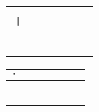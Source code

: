 \documentclass[12pt]{article}
\begin{document}
\begin{minipage}{0.45\textwidth}
\begin{tabular}{|c|c|c|c|c|c|}
\hline
+ &   &   &   &   &   \\
\hline
  &   &   &   &   &   \\
\hline
  &   &   &   &   &   \\
\hline
  &   &   &   &   &   \\
\hline
  &   &   &   &   &   \\
\hline
  &   &   &   &   &   \\
\hline
\end{tabular}
\end{minipage}
\hspace{1cm}  %
\begin{minipage}{0.45\textwidth}
\begin{tabular}{|c|c|c|c|c|c|}
\hline
$\cdot$ &   &   &   &   &   \\
\hline
        &   &   &   &   &   \\
\hline
        &   &   &   &   &   \\
\hline
        &   &   &   &   &   \\
\hline
        &   &   &   &   &   \\
\hline
        &   &   &   &   &   \\
\hline
\end{tabular}
\end{minipage}
\end{document}
